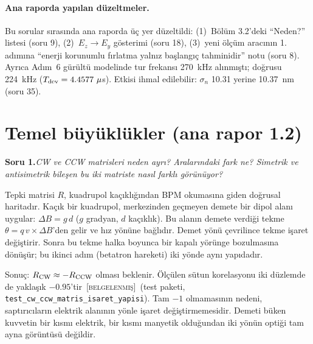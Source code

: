 \documentclass[11pt,a4paper]{article}
\newcommand{\kod}[1]{{\XeTeXinterchartokenstate=0\texttt{#1}}}
\newcommand{\BEL}{\textsc{[belgelenmiş]}}
\newcounter{soru}
\newcommand{\soru}[2]{%
  \par\medskip\noindent\textbf{Soru #1.}\enspace\textit{#2}\par\nopagebreak\smallskip}
\begin{document}
\paragraph{Ana raporda yapılan düzeltmeler.} Bu sorular sırasında ana raporda üç yer düzeltildi:
(1)~Bölüm 3.2'deki ``Neden?'' listesi (soru 9), (2)~$E_z\to E_y$ gösterimi (soru 18), (3)~yeni ölçüm
aracının 1. adımına ``enerji korunumlu fırlatma yalnız başlangıç tahminidir'' notu (soru 8). Ayrıca
Adım~6 gürültü modelinde tur frekansı 270~kHz alınmıştı; doğrusu 224~kHz ($T_{\rm dev}=4.4577~\mu$s).
Etkisi ihmal edilebilir: $\sigma_n$ 10.31 yerine 10.37~nm (soru 35).

\section{Temel büyüklükler (ana rapor 1.2)}

\soru{1}{CW ve CCW matrisleri neden ayrı? Aralarındaki fark ne? Simetrik ve antisimetrik bileşen bu iki
matriste nasıl farklı görünüyor?}

Tepki matrisi $R$, kuadrupol kaçıklığından BPM okumasına giden doğrusal haritadır. Kaçık bir kuadrupol,
merkezinden geçmeyen demete bir dipol alanı uygular: $\Delta B = g\,d$ ($g$ gradyan, $d$ kaçıklık). Bu
alanın demete verdiği tekme $\theta=q\,v\times\Delta B$'den gelir ve hız yönüne bağlıdır. Demet yönü
çevrilince tekme işaret değiştirir. Sonra bu tekme halka boyunca bir kapalı yörünge bozulmasına dönüşür;
bu ikinci adım (betatron hareketi) iki yönde aynı yapıdadır.

Sonuç: $R_{\rm CW}\approx -R_{\rm CCW}$ olması beklenir. Ölçülen sütun korelasyonu iki düzlemde de
yaklaşık $-0.95$'tir~\BEL\ (test paketi, \kod{test\_cw\_ccw\_matris\_isaret\_yapisi}). Tam $-1$ olmamasının
nedeni, saptırıcıların elektrik alanının yönle işaret değiştirmemesidir. Demeti büken kuvvetin bir kısmı
elektrik, bir kısmı manyetik olduğundan iki yönün optiği tam ayna görüntüsü değildir.
\end{document}
